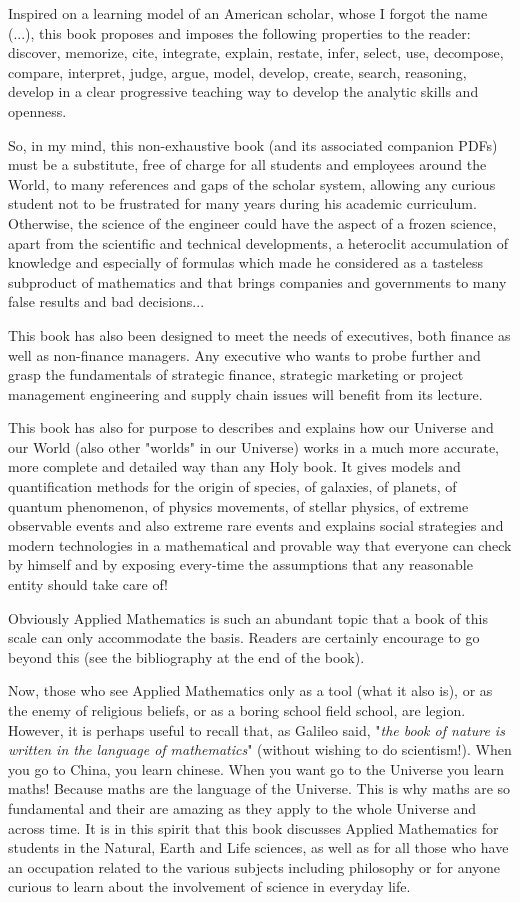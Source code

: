 	Inspired on a learning model of an American scholar, whose I forgot the name (...), this book proposes and imposes the following properties to the reader: discover, memorize, cite, integrate, explain, restate, infer, select, use, decompose, compare, interpret, judge, argue, model, develop, create, search, reasoning, develop in a clear progressive teaching way to develop the analytic skills and openness.

	So, in my mind, this non-exhaustive book (and its associated companion PDFs) must be a substitute, free of charge for all students and employees around the World, to many references and gaps of the scholar system, allowing any curious student not to be frustrated for many years during his academic curriculum. Otherwise, the science of the engineer could have the aspect of a frozen science, apart from the scientific and technical developments, a heteroclit accumulation of knowledge and especially of formulas which made he considered as a tasteless subproduct of mathematics and that brings companies and governments to many false results and bad decisions...
	
	This book has also been designed to meet the needs of executives, both finance as well as non-finance managers. Any executive who wants to probe further and grasp the fundamentals of strategic finance, strategic marketing or project management engineering and supply chain issues will benefit from its lecture. 
	
	This book has also for purpose to describes and explains how our Universe and our World (also other "worlds" in our Universe) works in a much more accurate, more complete and detailed way than any Holy book. It gives models and quantification methods for the origin of species, of galaxies, of planets, of quantum phenomenon, of physics movements, of stellar physics, of extreme observable events and also extreme rare events and explains social strategies and modern technologies in a mathematical and provable way that everyone can check by himself and by exposing every-time the assumptions that any reasonable entity should take care of!
	
	Obviously Applied Mathematics is such an abundant topic that a book of this scale can only accommodate the basis. Readers are certainly encourage to go beyond this (see the bibliography at the end of the book).

	Now, those who see Applied Mathematics only as a tool (what it also is), or as the enemy of religious beliefs, or as a boring school field school, are legion. However, it is perhaps useful to recall that, as Galileo said, "\textit{the book of nature is written in the language of mathematics}" (without wishing to do scientism!). When you go to China, you learn chinese. When you want go to the Universe you learn maths! Because maths are the language of the Universe. This is why maths are so fundamental and their are amazing as they apply to the whole Universe and across time. It is in this spirit that this book discusses Applied Mathematics for students in the Natural, Earth and Life sciences, as well as for all those who have an occupation related to the various subjects including philosophy or for anyone curious to learn about the involvement of science in everyday life.


